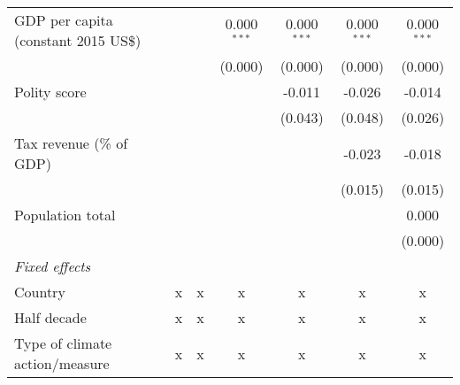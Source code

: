 \begin{tabular}{lcccccc}
   GDP per capita (constant 2015 US\$)                                                                 &         &               & 0.000$^{***}$  & 0.000$^{***}$  & 0.000$^{***}$  & 0.000$^{***}$\\   
                                                                                                       &         &               & (0.000)        & (0.000)        & (0.000)        & (0.000)\\   
   Polity score                                                                                        &         &               &                & -0.011         & -0.026         & -0.014\\   
                                                                                                       &         &               &                & (0.043)        & (0.048)        & (0.026)\\   
   Tax revenue (\% of GDP)                                                                             &         &               &                &                & -0.023         & -0.018\\   
                                                                                                       &         &               &                &                & (0.015)        & (0.015)\\   
   Population total                                                                                    &         &               &                &                &                & 0.000\\   
                                                                                                       &         &               &                &                &                & (0.000)\\   
   \emph{Fixed effects}\\
   Country                                                                                             & x       & x             & x              & x              & x              & x\\  
   Half decade                                                                                         & x       & x             & x              & x              & x              & x\\  
   Type of climate action/measure                                                                      & x       & x             & x              & x              & x              & x\\  

\end{tabular}
